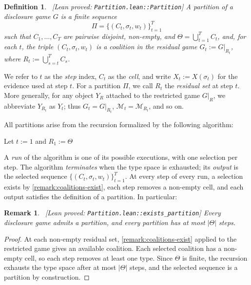 \documentclass[11pt]{article}
\newtheorem{remark}{Remark}
\newtheorem{definition}{Definition}
\newcommand{\Msg}{\mathcal{M}}
\newcommand{\leanproved}[1]{{\footnotesize\textsf{\textcolor{green!55!black}{[Lean proved: \texttt{#1}]}}}}
\begin{document}
\begin{definition}\ \leanproved{Partition.lean::Partition}
    A \emph{partition} of a disclosure game $G$ is a finite sequence
    \[
        \Pi = \{ (C_t,\sigma_t,w_t) \}_{t=1}^T
    \]
    such that $C_1, \ldots, C_T$ are pairwise disjoint, non-empty, and $\Theta = \bigcup_{t=1}^T C_t$, and, for each $t$, the triple $(C_t,\sigma_t,w_t)$ is a coalition in the residual game $G_t := G\vert_{R_t}$, where $R_t := \bigcup_{s=t}^T C_s$.
\end{definition}

We refer to $t$ as the \emph{step} index, $C_t$ as the \emph{cell}, and write $X_t := X(\sigma_t)$ for the evidence used at step $t$. For a partition $\Pi$, we call $R_t$ the \emph{residual set} at step $t$. More generally, for any object $Y_R$ attached to the restricted game $G\vert_R$, we abbreviate $Y_{R_t}$ as $Y_t$; thus $G_t=G\vert_{R_t}$, $\Msg_t=\Msg_{R_t}$, and so on.

All partitions arise from the recursion formalized by the following algorithm:
\begin{algorithm}[ht!]
    \caption{Partition Algorithm}\label{alg:partition}
    Let $t := 1$ and $R_1 := \Theta$\;
\end{algorithm}

A \emph{run} of the algorithm is one of its possible executions, with one selection per step. The algorithm \emph{terminates} when the type space is exhausted; its \emph{output} is the selected sequence $\{ (C_t,\sigma_t,w_t) \}_{t=1}^T$. At every step of every run, a selection exists by \cref{remark:coalitions-exist}, each step removes a non-empty cell, and each output satisfies the definition of a partition. In particular:
\begin{remark}\label{remark:partitions-exist}\ \leanproved{Partition.lean::exists\_partition}
    Every disclosure game admits a partition, and every partition has at most $|\Theta|$ steps.
\end{remark}
\begin{proof}
    At each non-empty residual set, \cref{remark:coalitions-exist} applied to the restricted game gives an available coalition. Each selected coalition has a non-empty cell, so each step removes at least one type. Since $\Theta$ is finite, the recursion exhausts the type space after at most $|\Theta|$ steps, and the selected sequence is a partition by construction.
\end{proof}
\end{document}
